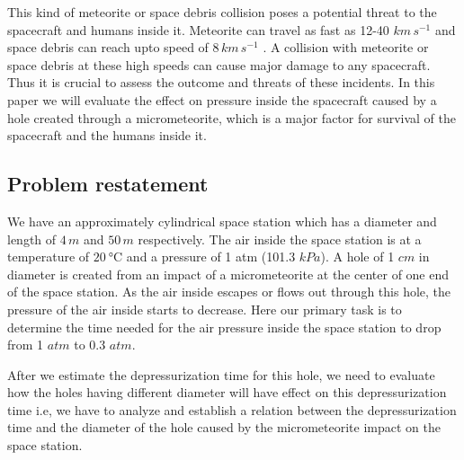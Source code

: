 \documentclass[a4paper, 14pt]{extarticle}
\begin{document}
This kind of meteorite or space debris collision poses a potential threat to the spacecraft and humans inside it. Meteorite can travel as fast as 12-40 $km\,s^{-1}$ \citep{wustl2024} and space debris can reach upto speed of $8\, km\,s^{-1}$ \citep{nasa2024}. A collision with meteorite or space debris at these high speeds can cause major damage to any spacecraft. Thus it is crucial to assess the outcome and threats of these incidents. In this paper we will evaluate the effect on pressure inside the spacecraft caused by a hole created through a micrometeorite, which is a major factor for survival of the spacecraft and the humans inside it.
\subsection{Problem restatement}
We have an approximately cylindrical space station which has a diameter and length of $4\, m$ and $50\, m$ respectively. The air inside the space station is at a temperature of $\SI{20}{\degreeCelsius}$ and a pressure of 1 atm (101.3 $kPa$). A hole of 1 $cm$ in diameter is created from an impact of a micrometeorite at the center of one end of the space station. As the air inside escapes or flows out through this hole, the pressure of the air inside starts to decrease. Here our primary task is to determine the time needed for the air pressure inside the space station to drop from 1 $atm$ to 0.3 $atm$.

After we estimate the depressurization time for this hole, we need to evaluate how the holes having different diameter will have effect on this depressurization time i.e, we have to analyze and establish a relation between the depressurization time and the diameter of the hole caused by the micrometeorite impact on the space station.

\end{document}
